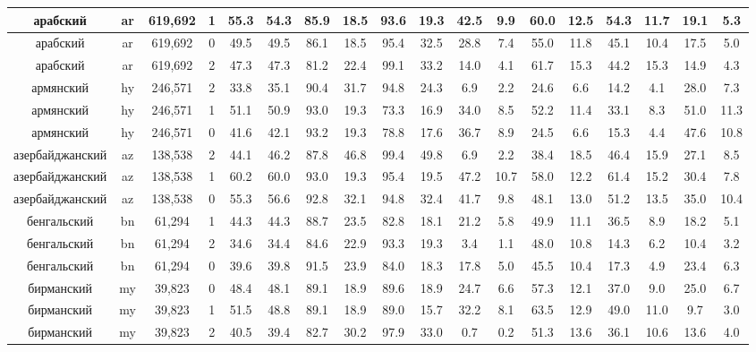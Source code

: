 \begin{table*}
{\begin{tabular}{|c|c|c|c||c|c|c|c|c|c|c|c|c|c|c|c|c|c|}
арабский & ar & 619,692 & 1 & 55.3 & 54.3 & 85.9 & 18.5 & 93.6 & 19.3 & 42.5 & 9.9 & 60.0 & 12.5 & 54.3 & 11.7 & 19.1 & 5.3\\ \hline
арабский & ar & 619,692 & 0 & 49.5 & 49.5 & 86.1 & 18.5 & 95.4 & 32.5 & 28.8 & 7.4 & 55.0 & 11.8 & 45.1 & 10.4 & 17.5 & 5.0\\ \hline
арабский & ar & 619,692 & 2 & 47.3 & 47.3 & 81.2 & 22.4 & 99.1 & 33.2 & 14.0 & 4.1 & 61.7 & 15.3 & 44.2 & 15.3 & 14.9 & 4.3\\ \hline
армянский & hy & 246,571 & 2 & 33.8 & 35.1 & 90.4 & 31.7 & 94.8 & 24.3 & 6.9 & 2.2 & 24.6 & 6.6 & 14.2 & 4.1 & 28.0 & 7.3\\ \hline
армянский & hy & 246,571 & 1 & 51.1 & 50.9 & 93.0 & 19.3 & 73.3 & 16.9 & 34.0 & 8.5 & 52.2 & 11.4 & 33.1 & 8.3 & 51.0 & 11.3\\ \hline
армянский & hy & 246,571 & 0 & 41.6 & 42.1 & 93.2 & 19.3 & 78.8 & 17.6 & 36.7 & 8.9 & 24.5 & 6.6 & 15.3 & 4.4 & 47.6 & 10.8\\ \hline
азербайджанский & az & 138,538 & 2 & 44.1 & 46.2 & 87.8 & 46.8 & 99.4 & 49.8 & 6.9 & 2.2 & 38.4 & 18.5 & 46.4 & 15.9 & 27.1 & 8.5\\ \hline
азербайджанский & az & 138,538 & 1 & 60.2 & 60.0 & 93.0 & 19.3 & 95.4 & 19.5 & 47.2 & 10.7 & 58.0 & 12.2 & 61.4 & 15.2 & 30.4 & 7.8\\ \hline
азербайджанский & az & 138,538 & 0 & 55.3 & 56.6 & 92.8 & 32.1 & 94.8 & 32.4 & 41.7 & 9.8 & 48.1 & 13.0 & 51.2 & 13.5 & 35.0 & 10.4\\ \hline
бенгальский & bn & 61,294 & 1 & 44.3 & 44.3 & 88.7 & 23.5 & 82.8 & 18.1 & 21.2 & 5.8 & 49.9 & 11.1 & 36.5 & 8.9 & 18.2 & 5.1\\ \hline
бенгальский & bn & 61,294 & 2 & 34.6 & 34.4 & 84.6 & 22.9 & 93.3 & 19.3 & 3.4 & 1.1 & 48.0 & 10.8 & 14.3 & 6.2 & 10.4 & 3.2\\ \hline
бенгальский & bn & 61,294 & 0 & 39.6 & 39.8 & 91.5 & 23.9 & 84.0 & 18.3 & 17.8 & 5.0 & 45.5 & 10.4 & 17.3 & 4.9 & 23.4 & 6.3\\ \hline
бирманский & my & 39,823 & 0 & 48.4 & 48.1 & 89.1 & 18.9 & 89.6 & 18.9 & 24.7 & 6.6 & 57.3 & 12.1 & 37.0 & 9.0 & 25.0 & 6.7\\ \hline
бирманский & my & 39,823 & 1 & 51.5 & 48.8 & 89.1 & 18.9 & 89.0 & 15.7 & 32.2 & 8.1 & 63.5 & 12.9 & 49.0 & 11.0 & 9.7 & 3.0\\ \hline
бирманский & my & 39,823 & 2 & 40.5 & 39.4 & 82.7 & 30.2 & 97.9 & 33.0 & 0.7 & 0.2 & 51.3 & 13.6 & 36.1 & 10.6 & 13.6 & 4.0\\ \hline

\end{tabular}}
\end{table*}
